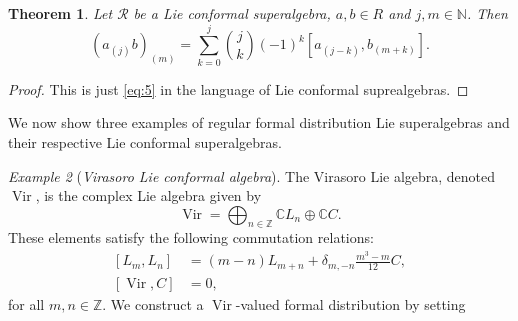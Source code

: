 \documentclass[a4paper, 12pt, reqno]{amsart}
\newtheorem{theorem}{Theorem}[subsection]
\theoremstyle{remark}
\newtheorem{example}[theorem]{Example}
\numberwithin{equation}{subsection}
\DeclareMathOperator{\Vir}{Vir}
\begin{document}
\begin{theorem}
  \label{thr:6}
  Let $\mathcal{R}$ be a Lie conformal superalgebra, $a, b \in R$ and $j, m \in \mathbb{N}$.
  Then
  \begin{equation*}
    (a_{(j)}b)_{(m)} = \sum_{k = 0}^j\binom{j}{k}(-1)^k[a_{(j - k)},b_{(m + k)}].
  \end{equation*}
\end{theorem}

\begin{proof}
  This is just \eqref{eq:5} in the language of Lie conformal suprealgebras.
\end{proof}

We now show three examples of regular formal distribution Lie superalgebras and their respective Lie conformal superalgebras.

\begin{example}[\emph{Virasoro Lie conformal algebra}]
  \label{exa:1}
  The Virasoro Lie algebra, denoted $\Vir$, is the complex Lie algebra given by
  \begin{equation*}
    \Vir = \bigoplus_{n \in \mathbb{Z}}\mathbb{C}L_{n} \oplus \mathbb{C}C.
  \end{equation*}
  These elements satisfy the following commutation relations:
  \begin{equation}
    \label{eq:8}
    \begin{aligned}
      [L_m, L_n] &= (m - n)L_{m + n} + \delta_{m, -n}\frac{m^3 - m}{12}C, \\
      [\Vir, C] &= 0,
    \end{aligned}
  \end{equation}
  for all $m, n \in \mathbb{Z}$.
  We construct a $\Vir$-valued formal distribution by setting
  

\end{example}
\end{document}
